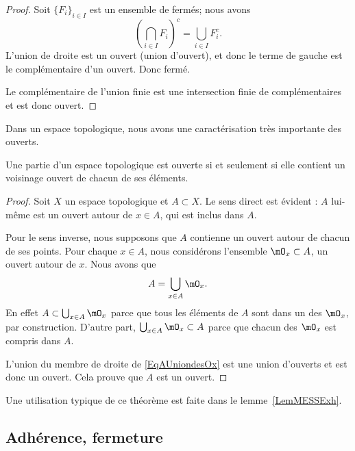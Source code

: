 \begin{proof}
    Soit \( \{ F_i \}_{i\in I} \) est un ensemble de fermés; nous avons
    \begin{equation}
        \left( \bigcap_{i\in I}F_i \right)^c=\bigcup_{i\in I}F_i^c.
    \end{equation}
    L'union de droite est un ouvert (union d'ouvert), et donc le terme de gauche est le complémentaire d'un ouvert. Donc fermé.

    Le complémentaire de l'union finie est une intersection finie de complémentaires et est donc ouvert.
\end{proof}

Dans un espace topologique, nous avons une caractérisation très importante des ouverts.
\begin{theorem}		\label{ThoPartieOUvpartouv}
    Une partie d'un espace topologique est ouverte si et seulement si elle contient un voisinage ouvert de chacun de ses éléments.
\end{theorem}

\begin{proof}
    Soit \( X\) un espace topologique et \( A\subset X\). Le sens direct est évident : $A$ lui-même est un ouvert autour de $x\in A$, qui est inclus dans $A$.

Pour le sens inverse, nous supposons que \( A\) contienne un ouvert autour de chacun de ses points. Pour chaque $x\in A$, nous considérons l'ensemble $\mO_x\subset A$, un ouvert autour de $x$. Nous avons que
\begin{equation}	\label{EqAUniondesOx}
	A=\bigcup_{x\in A}\mO_x.
\end{equation}
En effet $A\subset\bigcup_{x\in A}\mO_x$ parce que tous les éléments de $A$ sont dans un des $\mO_x$, par construction. D'autre part, $\bigcup_{x\in A}\mO_x\subset A$ parce que chacun des $\mO_x$ est compris dans $A$.

L'union du membre de droite de \eqref{EqAUniondesOx} est une union d'ouverts et est donc un ouvert. Cela prouve que $A$ est un ouvert.

\end{proof}
Une utilisation typique de ce théorème est faite dans le lemme~\ref{LemMESSExh}.

\subsection{Adhérence, fermeture}

